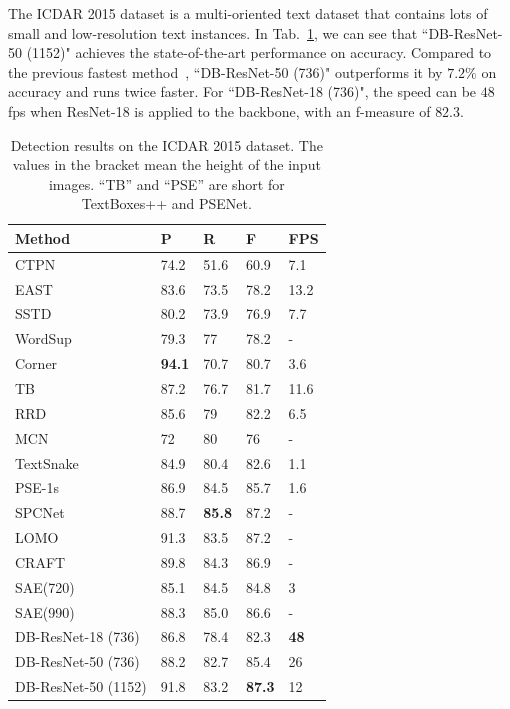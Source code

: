 \documentclass[letterpaper]{article} %
\newcommand{\minisection}[1]{\noindent{\textbf{#1}}}
\begin{document}
\minisection{Multi-oriented text detection}
The ICDAR 2015 dataset is a multi-oriented text dataset that contains lots of small and low-resolution text instances.
In Tab.~\ref{tab:ic15}, we can see that ``DB-ResNet-50 (1152)" achieves the state-of-the-art performance on accuracy.
Compared to the previous fastest method~\cite{east}, ``DB-ResNet-50 (736)" outperforms it by $7.2\%$ on accuracy and runs twice faster. For ``DB-ResNet-18 (736)", the speed can be $48$ fps when ResNet-18 is applied to the backbone, with an f-measure of $82.3$.
\begin{table}[ht]
\centering
\caption{Detection results on the ICDAR 2015 dataset. The values in the bracket mean the height of the input images. ``TB'' and ``PSE'' are short for TextBoxes++ and PSENet.}
\begin{tabularx}{1.0\linewidth}{@{}l*{4}X@{}}
\toprule
Method        & P    & R    & F    & FPS  \\ \midrule
CTPN~\cite{eccv/TianHHH016}          & 74.2 & 51.6 & 60.9 & 7.1  \\
EAST~\cite{east}          & 83.6 & 73.5 & 78.2 & 13.2 \\
SSTD~\cite{sstd}          & 80.2 & 73.9 & 76.9 & 7.7  \\
WordSup~\cite{hu2017wordsup}       & 79.3 & 77   & 78.2 & -  \\
Corner~\cite{lyu2018multi}    & \textbf{94.1} & 70.7 & 80.7 & 3.6  \\
TB~\cite{TextBoxes++}   & 87.2 & 76.7 & 81.7 & 11.6 \\
RRD~\cite{liao2018rotation}           & 85.6 & 79   & 82.2 & 6.5  \\
MCN~\cite{mcn}           & 72   & 80   & 76   & -  \\
TextSnake~\cite{long2018textsnake}     & 84.9 & 80.4 & 82.6 & 1.1  \\
PSE-1s~\cite{wang2019shape}    & 86.9 & 84.5 & 85.7 & 1.6  \\
SPCNet~\cite{spc}       & 88.7 & \textbf{85.8} & 87.2 & -  \\
LOMO~\cite{lomo}      & 91.3 & 83.5 & 87.2 & -  \\
CRAFT~\cite{craft}      & 89.8 & 84.3 & 86.9 & -  \\
SAE(720)~\cite{tian2019learning}  & 85.1  & 84.5  & 84.8  & 3       \\
SAE(990)~\cite{tian2019learning}  & 88.3   & 85.0  & 86.6  & -       \\
\midrule
DB-ResNet-18 (736) & 86.8 & 78.4 & 82.3 & \textbf{48}   \\
DB-ResNet-50 (736) & 88.2   & 82.7 & 85.4 & 26   \\
DB-ResNet-50 (1152) & 91.8   & 83.2 & \textbf{87.3} & 12   \\ \bottomrule
\end{tabularx}
\label{tab:ic15}
\end{table}
\end{document}
